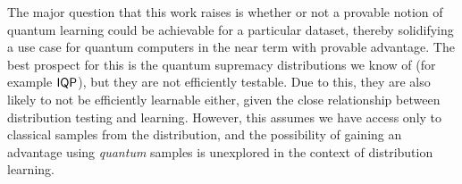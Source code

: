 The major question that this work raises is whether or not a provable notion of quantum learning could be achievable for a particular dataset, thereby solidifying a use case for quantum computers in the near term with provable advantage. The best prospect for this is the quantum supremacy distributions we know of (for example $\operatorname{\textsf{IQP}}$), but they are not efficiently testable\cite{hangleiter_sample_2018}. Due to this, they are also likely to not be efficiently learnable either, given the close relationship between distribution testing and learning\cite{goldreich_property_1998}. However, this assumes we have access only to classical samples from the distribution, and the possibility of gaining an advantage using \textit{quantum} samples\cite{schuld_supervised_2018, arunachalam_survey_2017} is unexplored in the context of distribution learning. 